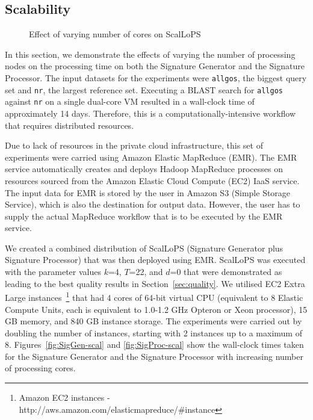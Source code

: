 \documentclass[titlepage]{csetr}
\begin{document}
\subsection{Scalability}


\begin{figure}[t]
\centering
{}
\caption{Effect of varying number of cores on ScalLoPS}
\label{fig:exp-scalability}
\end{figure}

In this section, we demonstrate the effects of varying the number of processing nodes on the processing time on both the Signature Generator and the Signature Processor. The input datasets for the experiments were \texttt{allgos}, the biggest query set and \texttt{nr}, the largest reference set. Executing a BLAST search for \texttt{allgos} against \texttt{nr} on a single dual-core VM resulted in a wall-clock time of approximately 14 days. Therefore, this is a computationally-intensive workflow that requires distributed resources. 

Due to lack of resources in the private cloud infrastructure, this set of experiments were carried using Amazon Elastic MapReduce (EMR). The EMR service automatically creates and deploys Hadoop MapReduce processes on resources sourced from the Amazon Elastic Cloud Compute (EC2) IaaS service. The input data for EMR is stored by the user in Amazon S3 (Simple Storage Service), which is also the destination for output data. However, the user has to supply the actual MapReduce workflow that is to be executed by the EMR service.

We created a combined distribution of ScalLoPS (Signature Generator plus Signature Processor) that was then deployed using EMR. ScalLoPS was executed with the parameter values $k$=4, $T$=22, and $d$=0 that were demonstrated as leading to the best quality results in Section~\ref{sec:quality}. We utilised EC2 Extra Large instances~\footnote{Amazon EC2 instances - http://aws.amazon.com/elasticmapreduce/\#instance} that had 4 cores of 64-bit virtual CPU (equivalent to 8 Elastic Compute Units, each is equivalent to 1.0-1.2 GHz Opteron or Xeon processor), 15 GB memory, and 840 GB instance storage. The experiments were carried out by doubling the number of instances, starting with 2 instances up to a maximum of 8. Figures~\ref{fig:SigGen-scal} and \ref{fig:SigProc-scal} show the wall-clock times taken for the Signature Generator and the Signature Processor with increasing number of processing cores.
\end{document}
